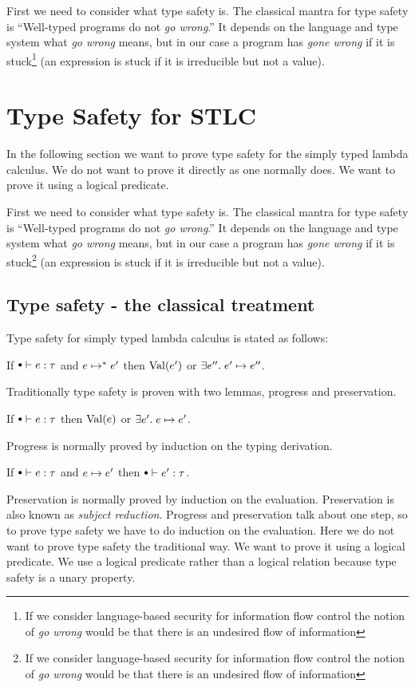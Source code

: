 First we need to consider what type safety is. The classical mantra for type safety is ``Well-typed programs do not \emph{go wrong}.'' It depends on the language and type system what \emph{go wrong} means, but in our case a program has \emph{gone wrong} if it is stuck\footnote{If we consider language-based security for information flow control the notion of \emph{go wrong} would be that there is an undesired flow of information} (an expression is stuck if it is irreducible but not a value). 

\section*{Type Safety for STLC}
In the following section we want to prove type safety for the simply typed lambda calculus. We do not want to prove it directly as one normally does. We want to prove it using a logical predicate.

First we need to consider what type safety is. The classical mantra for type safety is ``Well-typed programs do not \emph{go wrong}.'' It depends on the language and type system what \emph{go wrong} means, but in our case a program has \emph{gone wrong} if it is stuck\footnote{If we consider language-based security for information flow control the notion of \emph{go wrong} would be that there is an undesired flow of information} (an expression is stuck if it is irreducible but not a value). 
\subsection*{Type safety - the classical treatment}
Type safety for simply typed lambda calculus is stated as follows:
\begin{stlctypesafety}
  If $\mtenv \vdash e : \tau$ and $e \mapsto^{*} e'$ then $\operatorname{Val}(e')$ or $\exists e''. \; e' \mapsto e''$.
\end{stlctypesafety}
Traditionally type safety is proven with two lemmas, progress and preservation.
\begin{progress}[Progress]
  If $\mtenv \vdash e : \tau$ then $\operatorname{Val}(e)$ or $\exists e'. \; e \mapsto e'$.
\end{progress}
Progress is normally proved by induction on the typing derivation.
\begin{preservation}[Preservation]
  If $\mtenv \vdash e : \tau$ and $e \mapsto e'$ then $\mtenv \vdash e' : \tau$.
\end{preservation}
Preservation is normally proved by induction on the evaluation.
Preservation is also known as \emph{subject reduction}. Progress and preservation talk about one step, so to prove type safety we have to do induction on the evaluation. Here we do not want to prove type safety the traditional way. We want to prove it using a logical predicate. We use a logical predicate rather than a logical relation because type safety is a unary property.

